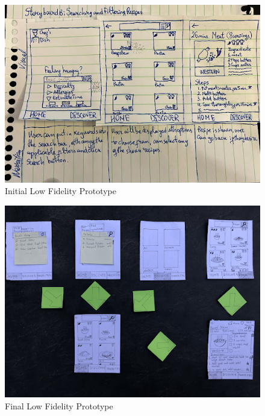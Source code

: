\documentclass[11pt,english]{article}
\begin{document}
\begin{figure}
\centering
  \includegraphics[width=\linewidth]{figure6v2.jpg}
  \caption{Initial Low Fidelity Prototype}
  \label{fig:figure6}
\end{figure}

\begin{figure}
\centering
  \includegraphics[width=\linewidth]{figure7.png}
  \caption{Final Low Fidelity Prototype}
  \label{fig:figure7}
\end{figure}
\end{document}
